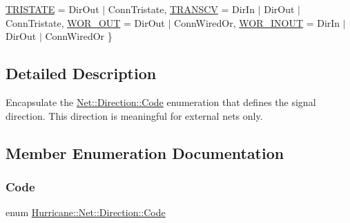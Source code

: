 \begin{DoxyCompactItemize}
\mbox{\hyperlink{classHurricane_1_1Net_1_1Direction_a5b34d7c3ac52628861af3a46f781fae4a71a487a8129c354630d5e989d3994c98}{T\+R\+I\+S\+T\+A\+TE}} = Dir\+Out $\vert$ Conn\+Tristate, 
\newline
\mbox{\hyperlink{classHurricane_1_1Net_1_1Direction_a5b34d7c3ac52628861af3a46f781fae4ab8965ba57b68fc4b58c428fc4c8da397}{T\+R\+A\+N\+S\+CV}} = Dir\+In $\vert$ Dir\+Out $\vert$ Conn\+Tristate, 
\newline
\mbox{\hyperlink{classHurricane_1_1Net_1_1Direction_a5b34d7c3ac52628861af3a46f781fae4a1cc48f96bc28740eb7f0d7ba7e2b237c}{W\+O\+R\+\_\+\+O\+UT}} = Dir\+Out $\vert$ Conn\+Wired\+Or, 
\newline
\mbox{\hyperlink{classHurricane_1_1Net_1_1Direction_a5b34d7c3ac52628861af3a46f781fae4a2fbc95d7882aab3453d5549493763c3c}{W\+O\+R\+\_\+\+I\+N\+O\+UT}} = Dir\+In $\vert$ Dir\+Out $\vert$ Conn\+Wired\+Or
 \}
\end{DoxyCompactItemize}


\subsection{Detailed Description}
Encapsulate the \mbox{\hyperlink{classHurricane_1_1Net_1_1Direction_a5b34d7c3ac52628861af3a46f781fae4}{Net\+::\+Direction\+::\+Code}} enumeration that defines the signal direction. This direction is meaningful for external nets only. 

\subsection{Member Enumeration Documentation}
\mbox{\label{classHurricane_1_1Net_1_1Direction_a5b34d7c3ac52628861af3a46f781fae4}} 
\subsubsection{\texorpdfstring{Code}{Code}}
{\footnotesize\ttfamily enum \mbox{\hyperlink{classHurricane_1_1Net_1_1Direction_a5b34d7c3ac52628861af3a46f781fae4}{Hurricane\+::\+Net\+::\+Direction\+::\+Code}}}

